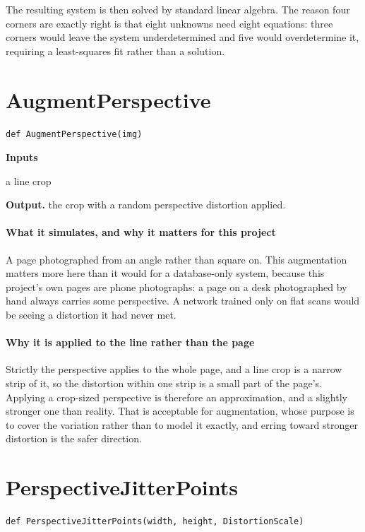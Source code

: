 The resulting system is then solved by standard linear algebra. The reason four corners are exactly right is that eight unknowns need eight equations: three corners would leave the system underdetermined and five would overdetermine it, requiring a least-squares fit rather than a solution.


\section{AugmentPerspective}
\begin{lstlisting}[style=sig]
def AugmentPerspective(img)
\end{lstlisting}

\noindent\textbf{Inputs}
\begin{description}[leftmargin=2.2em,style=nextline,font=\normalfont\ttfamily]\setlength\itemsep{1pt}
  \item[{img}] \normalfont a line crop
\end{description}

\noindent\textbf{Output.} the crop with a random perspective distortion applied.


\paragraph{What it simulates, and why it matters for this project}
A page photographed from an angle rather than square on. This augmentation matters more here than it would for a database-only system, because this project's own pages are phone photographs: a page on a desk photographed by hand always carries some perspective. A network trained only on flat scans would be seeing a distortion it had never met.


\paragraph{Why it is applied to the line rather than the page}
Strictly the perspective applies to the whole page, and a line crop is a narrow strip of it, so the distortion within one strip is a small part of the page's. Applying a crop-sized perspective is therefore an approximation, and a slightly stronger one than reality. That is acceptable for augmentation, whose purpose is to cover the variation rather than to model it exactly, and erring toward stronger distortion is the safer direction.


\section{PerspectiveJitterPoints}
\begin{lstlisting}[style=sig]
def PerspectiveJitterPoints(width, height, DistortionScale)
\end{lstlisting}


